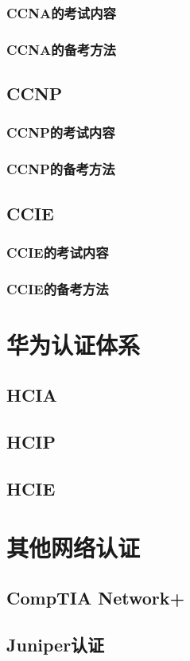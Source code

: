 \documentclass{book}
\begin{document}
\subsubsection{CCNA的考试内容}
\subsubsection{CCNA的备考方法}
\subsection{CCNP}
\subsubsection{CCNP的考试内容}
\subsubsection{CCNP的备考方法}
\subsection{CCIE}
\subsubsection{CCIE的考试内容}
\subsubsection{CCIE的备考方法}
\section{华为认证体系}
\subsection{HCIA}
\subsection{HCIP}
\subsection{HCIE}
\section{其他网络认证}
\subsection{CompTIA Network+}
\subsection{Juniper认证}
\end{document}
